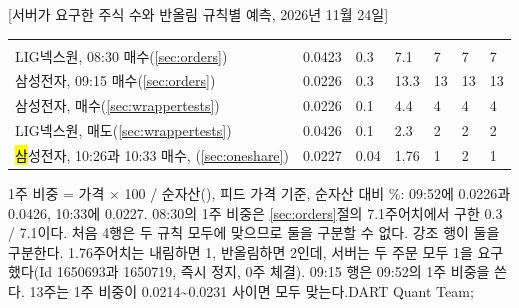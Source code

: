 [서버가 요구한 주식 수와 반올림 규칙별 예측, 2026년 11월 24일]{%
{\tabfont\begin{tabularx}{\linewidth}{>{\RaggedRight\arraybackslash}X R{15mm} R{9mm} R{12mm} R{12mm} R{14mm} R{12mm}}
 &  &  &  &  &  & \\
LIG넥스원, 08:30 매수(\ref{sec:orders}) & 0.0423 & 0.3 & 7.1 & 7 & 7 & 7\\\rowsep
삼성전자, 09:15 매수(\ref{sec:orders}) & 0.0226 & 0.3 & 13.3 & 13 & 13 & 13\\\rowsep
삼성전자, 매수(\ref{sec:wrappertests}) & 0.0226 & 0.1 & 4.4 & 4 & 4 & 4\\\rowsep
LIG넥스원, 매도(\ref{sec:wrappertests}) & 0.0426 & 0.1 & 2.3 & 2 & 2 & 2\\\rowsep
\hl 삼성전자, 10:26과 10:33 매수, (\ref{sec:oneshare}) & 0.0227 & 0.04 & 1.76 & 1 & 2 & 1\\
\end{tabularx}}}{1주 비중 = 가격 $\times$ 100 / 순자산(), 피드 가격 기준, 순자산 대비 \%: 09:52에 0.0226과 0.0426, 10:33에 0.0227. 08:30의 1주 비중은 \ref{sec:orders}절의 7.1주어치에서 구한 0.3 / 7.1이다. 처음 4행은 두 규칙 모두에 맞으므로 둘을 구분할 수 없다. 강조 행이 둘을 구분한다. 1.76주어치는 내림하면 1, 반올림하면 2인데, 서버는 두 주문 모두 1을 요구했다(Id 1650693과 1650719, 즉시 정지, 0주 체결). 09:15 행은 09:52의 1주 비중을 쓴다. 13주는 1주 비중이 0.0214\textasciitilde 0.0231 사이면 모두 맞는다.}{DART Quant Team; }
